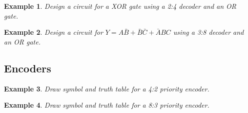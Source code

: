 \documentclass{article}
\newtheorem{example}{Example}
\newcommand{\bA}{\bar{A}}
\newcommand{\bB}{\bar{B}}
\newcommand{\bC}{\bar{C}}
\begin{document}
\begin{example}
Design a circuit for a XOR gate using a 2:4 decoder and an OR gate.
\end{example}
\vspace{10em}

\begin{example}
  Design a circuit for $Y = A\bB + \bB \bC + \bA B C$ using a 3:8 decoder and an
  OR gate.
\end{example}
\vspace{10em}


\subsection{Encoders}

\begin{example}
  Draw symbol and truth table for a 4:2 priority encoder. 
\end{example}
\vspace{10em}

\begin{example}
  Draw symbol and truth table for a 8:3 priority encoder. 
\end{example}
\vspace{10em}



\end{document}
